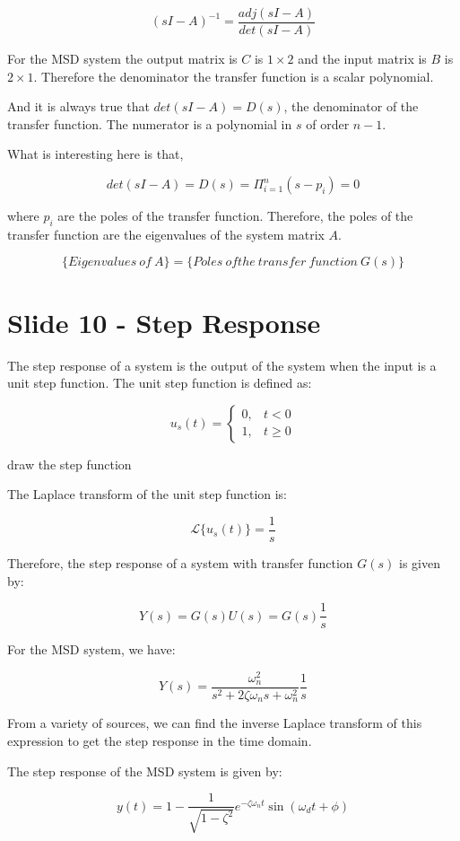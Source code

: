 \documentclass[
  letterpaper,
  DIV=11,
  numbers=noendperiod]{scrreprt}
\begin{document}
\[ (sI - A)^{-1} = \frac{adj(sI - A)}{det(sI - A)}\]

For the MSD system the output matrix is \(C\) is \(1 \times 2\) and the
input matrix is \(B\) is \(2 \times 1\). Therefore the denominator the
transfer function is a scalar polynomial.

And it is always true that \(det(sI - A) = D(s)\), the denominator of
the transfer function. The numerator is a polynomial in \(s\) of order
\(n-1\).

What is interesting here is that,

\[ det(sI-A) = D(s) = \Pi_{i=1}^{n} (s-p_i) = 0\]

where \(p_i\) are the poles of the transfer function. Therefore, the
poles of the transfer function are the eigenvalues of the system matrix
\(A\).

\[\{Eigenvalues \ of \ A\} = \{ Poles \ of the \ transfer \ function \ G(s) \}\]

\section{Slide 10 - Step Response}\label{slide-10---step-response}

The step response of a system is the output of the system when the input
is a unit step function. The unit step function is defined as:

\[ u_s(t) = \begin{cases} 0, & t < 0 \\ 1, & t \geq 0 \end{cases} \]

draw the step function

The Laplace transform of the unit step function is:

\[ \mathcal{L}\{u_s(t)\} = \frac{1}{s} \]

Therefore, the step response of a system with transfer function \(G(s)\)
is given by:

\[ Y(s) = G(s)U(s) = G(s)\frac{1}{s} \]

For the MSD system, we have:

\[ Y(s) = \frac{\omega_n^2}{s^2 + 2\zeta\omega_n s + \omega_n^2} \frac{1}{s} \]

From a variety of sources, we can find the inverse Laplace transform of
this expression to get the step response in the time domain.

The step response of the MSD system is given by:

\[ y(t) = 1 - \frac{1}{\sqrt{1-\zeta^2}} e^{-\zeta\omega_n t} \sin(\omega_d t + \phi) \]
\end{document}
